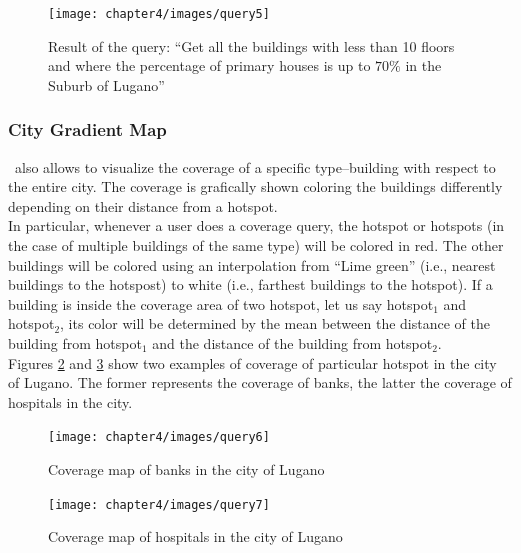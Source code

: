 \begin{figure} [H]
\centering
\texttt{[image: chapter4/images/query5]}
\caption{Result of the query: ``Get all the buildings with less than 10 floors and where the percentage of primary houses is up to $70\%$ in the Suburb of Lugano''}
\label{fig:query5}
\end{figure} 

\subsubsection{City Gradient Map}
\applicationName\ also allows to visualize the coverage of a specific type--building with respect to the entire city. The coverage is grafically shown coloring the buildings differently depending on their distance from a hotspot.\\

In particular, whenever a user does a coverage query, the hotspot or hotspots (in the case of multiple buildings of the same type) will be colored in red. The other buildings will be colored using an interpolation from ``Lime green'' (i.e., nearest buildings to the hotspost) to white (i.e., farthest buildings to the hotspot). 
If a building is inside the coverage area of two hotspot, let us say hotspot$_{1}$ and hotspot$_{2}$, its color will be determined by the mean between the distance of the building from hotspot$_{1}$ and the distance of the building from hotspot$_{2}$.\\

Figures \ref{fig:query6} and \ref{fig:query7} show two examples of coverage of particular hotspot in the city of Lugano. The former represents the coverage of banks, the latter the coverage of hospitals in the city.
\begin{figure} [H]
\centering
\texttt{[image: chapter4/images/query6]}
\caption{Coverage map of banks in the city of Lugano}
\label{fig:query6}
\end{figure} 
\begin{figure} [H]
\centering
\texttt{[image: chapter4/images/query7]}
\caption{Coverage map of hospitals in the city of Lugano}
\label{fig:query7}
\end{figure} 